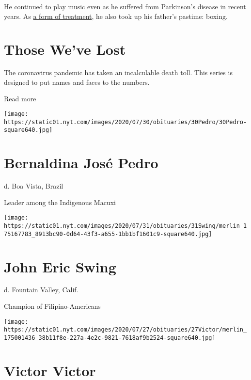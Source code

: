 He continued to play music even as he suffered from Parkinson's disease
in recent years. As \href{https://www.rocksteadyboxing.org/}{a form of
treatment}, he also took up his father's pastime: boxing.

\href{https://www.nytimes.com/interactive/2020/obituaries/people-died-coronavirus-obituaries.html?action=click\&pgtype=Article\&state=default\&region=BELOW_MAIN_CONTENT\&context=covid_obits_promo}{}

\hypertarget{those-weve-lost}{%
\section{Those We've Lost}\label{those-weve-lost}}

The coronavirus pandemic has taken an incalculable death toll. This
series is designed to put names and faces to the numbers.

Read more

\texttt{[image: https://static01.nyt.com/images/2020/07/30/obituaries/30Pedro/30Pedro-square640.jpg]}

\hypertarget{bernaldina-josuxe9-pedro}{%
\section{Bernaldina José Pedro}\label{bernaldina-josuxe9-pedro}}

d. Boa Vista, Brazil

Leader among the Indigenous Macuxi

\texttt{[image: https://static01.nyt.com/images/2020/07/31/obituaries/31Swing/merlin\_175167783\_8913bc90-0d64-43f3-a655-1bb1bf1601c9-square640.jpg]}

\hypertarget{john-eric-swing}{%
\section{John Eric Swing}\label{john-eric-swing}}

d. Fountain Valley, Calif.

Champion of Filipino-Americans

\texttt{[image: https://static01.nyt.com/images/2020/07/27/obituaries/27Victor/merlin\_175001436\_38b11f8e-227a-4e2c-9821-7618af9b2524-square640.jpg]}

\hypertarget{victor-victor}{%
\section{Victor Victor}\label{victor-victor}}

